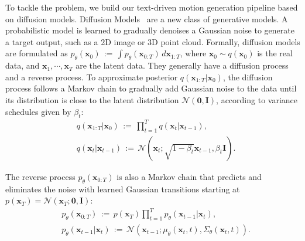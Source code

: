 To tackle the problem, we build our text-driven motion generation pipeline based on diffusion models. Diffusion Models~\citep{ho2020denoising,dhariwal2021diffusion,nichol2021improved,nichol2021glide} are a new class of generative models.  
A probabilistic model is learned to gradually denoises a Gaussian noise to generate a target output, such as a 2D image or 3D point cloud.
Formally, diffusion models are formulated as $p_{\theta}(\mathbf{x}_0)\,:=\,\int{p_{\theta}(\mathbf{x}_{0:T})\,d{\mathbf{x}_{1:T}}}$, where $\mathbf{x}_0 \sim q(\mathbf{x}_0)$ is the real data, and $\mathbf{x}_{1},\cdots,\mathbf{x}_{T}$ are the latent data.
They generally have a diffusion process and a reverse process.
To approximate posterior $q(\mathbf{x}_{1:T} \vert \mathbf{x}_0)$, the diffusion process follows a Markov chain to gradually add Gaussian noise to the data until its distribution is close to the latent distribution $\mathcal{N}(\mathbf{0}, \mathbf{I})$, according to variance schedules given by $\beta_t$:
\begin{equation}
    \begin{aligned}
        &q(\mathbf{x}_{1:T} \vert \mathbf{x}_0) \,:=\, \prod_{t=1}^{T} q(\mathbf{x}_t \vert \mathbf{x}_{t-1}), \\
        &q(\mathbf{x}_t \vert \mathbf{x}_{t-1}) \,:=\, \mathcal{N}(\mathbf{x}_t; \sqrt{1-\beta_t}\mathbf{x}_{t-1}, \beta_t\mathbf{I}).
    \end{aligned}
\end{equation}

The reverse process $p_{\theta}(\mathbf{x}_{0:T})$ is also a Markov chain that predicts and eliminates the noise with learned Gaussian transitions starting at $p(\mathbf{x}_{T}) = \mathcal{N}(\mathbf{x}_{T};\mathbf{0}, \mathbf{I})$:
\begin{equation}
\label{eq:ddpm_reverse}
    \begin{aligned}
        &p_{\theta}(\mathbf{x}_{0:T}) \,:=\, p(\mathbf{x}_{T}) \prod_{t=1}^{T}p_{\theta}(\mathbf{x}_{t-1} \vert \mathbf{x}_{t}),\\
        &p_{\theta}(\mathbf{x}_{t-1} \vert \mathbf{x}_{t}) \,:=\, \mathcal{N}(\mathbf{x}_{t-1}; \mu_\theta(\mathbf{x}_{t}, t), \Sigma_\theta(\mathbf{x}_{t}, t)).
    \end{aligned}
\end{equation}

